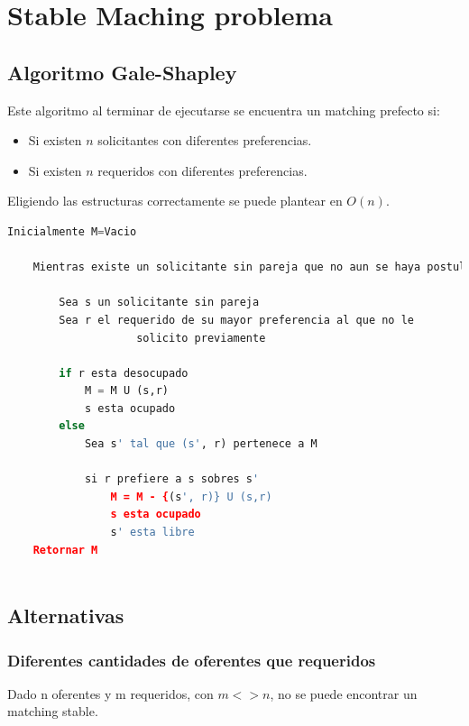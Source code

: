 \documentclass{article}
\begin{document}
\newpage{}
\tableofcontents
\newpage{}

\newpage
\section{Stable Maching problema}

\subsection{Algoritmo Gale-Shapley}
Este algoritmo al terminar de ejecutarse se encuentra un matching prefecto si:
\begin{itemize}
    \item Si existen \(n\) solicitantes con diferentes preferencias.
    \item Si existen \(n\) requeridos con diferentes preferencias.
\end{itemize}
Eligiendo las estructuras correctamente se puede plantear en \(O(n)\).

\begin{lstlisting}[language=Python, caption=Algoritmo de Gale-Shapley]
    Inicialmente M=Vacio
    
    Mientras existe un solicitante sin pareja que no aun se haya postulado a todas las parejas
    
        Sea s un solicitante sin pareja
        Sea r el requerido de su mayor preferencia al que no le
                    solicito previamente
            
        if r esta desocupado
            M = M U (s,r)
            s esta ocupado
        else
            Sea s' tal que (s', r) pertenece a M

            si r prefiere a s sobres s'
                M = M - {(s', r)} U (s,r)
                s esta ocupado
                s' esta libre
    Retornar M
    
\end{lstlisting}    

\newpage
\subsection{Alternativas}
\subsubsection{Diferentes cantidades de oferentes que requeridos}

Dado n oferentes y m requeridos, con \(m <> n\), no se puede encontrar un matching stable. 
\end{document}
